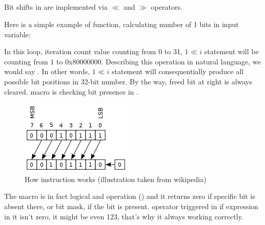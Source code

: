 \subsection{}

{Bit shifts in \CCpp are implemented via $\ll$ and $\gg$ operators.}

{Here is a simple example of function, calculating number of 1 bits in input variable:}



{In this loop, iteration count value  counting from 0 to 31, $1 \ll i$ statement will be counting from 1 to 0x80000000. 
Describing this operation in natural language, we would say .
In other words, $1 \ll i$ statement will consequentially produce all possible bit positions in 32-bit number.
By the way, freed bit at right is always cleared.  macro is checking bit presence in .}

\begin{figure}[ht!]
\centering
\includegraphics[scale=0.66]{bitfields/200px-Rotate_left_logically.png}
\caption{
{How \SHL instruction works (illustration taken from wikipedia)}}
\end{figure}

{The  macro is in fact logical and operation () 
and it returns zero if specific bit is absent there,
or bit mask, if the bit is present.
 operator triggered in \CCpp if expression in it isn't zero, it might be even 123, that's why
it always working correctly.}

